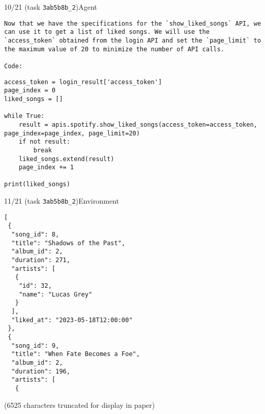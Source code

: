 \begin{minipage}{0.95\linewidth}
\begin{assistant_message_box}{{10/21 (task \texttt{3ab5b8b\_2})\hfill Agent}}
\scriptsize
\begin{Verbatim}[breaklines]
Now that we have the specifications for the `show_liked_songs` API, we can use it to get a list of liked songs. We will use the `access_token` obtained from the login API and set the `page_limit` to the maximum value of 20 to minimize the number of API calls.

Code:
\end{Verbatim}
\begin{tcolorbox}[colback=codebgcolor,boxrule=0pt]\begin{Verbatim}[breaklines]
access_token = login_result['access_token']
page_index = 0
liked_songs = []

while True:
    result = apis.spotify.show_liked_songs(access_token=access_token, page_index=page_index, page_limit=20)
    if not result:
        break
    liked_songs.extend(result)
    page_index += 1

print(liked_songs)
\end{Verbatim}
\end{tcolorbox}\end{assistant_message_box}
\end{minipage}

\hspace*{8mm}%
\begin{minipage}{0.95\linewidth}
\begin{user_message_box}{{11/21 (task \texttt{3ab5b8b\_2})\hfill Environment}}
\scriptsize
\begin{Verbatim}[breaklines]
[
 {
  "song_id": 8,
  "title": "Shadows of the Past",
  "album_id": 2,
  "duration": 271,
  "artists": [
   {
    "id": 32,
    "name": "Lucas Grey"
   }
  ],
  "liked_at": "2023-05-18T12:00:00"
 },
 {
  "song_id": 9,
  "title": "When Fate Becomes a Foe",
  "album_id": 2,
  "duration": 196,
  "artists": [
   {
\end{Verbatim}
(6525 characters truncated for display in paper)\end{user_message_box}
\end{minipage}

